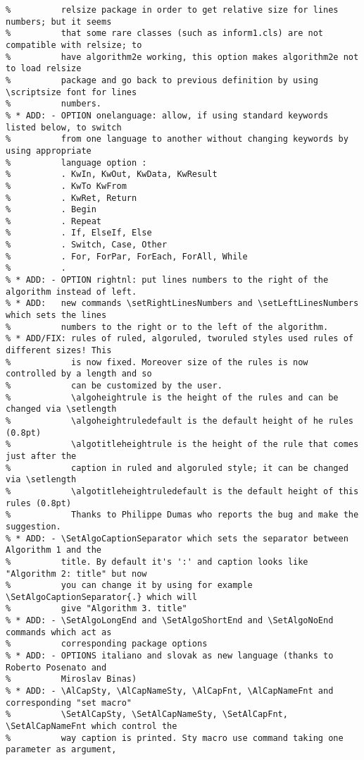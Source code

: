 \documentclass[a4paper]{article}
\begin{document}
\begin{verbatim}
%          relsize package in order to get relative size for lines numbers; but it seems
%          that some rare classes (such as inform1.cls) are not compatible with relsize; to
%          have algorithm2e working, this option makes algorithm2e not to load relsize
%          package and go back to previous definition by using \scriptsize font for lines
%          numbers.
% * ADD: - OPTION onelanguage: allow, if using standard keywords listed below, to switch
%          from one language to another without changing keywords by using appropriate
%          language option :
%          . KwIn, KwOut, KwData, KwResult
%          . KwTo KwFrom
%          . KwRet, Return
%          . Begin
%          . Repeat
%          . If, ElseIf, Else
%          . Switch, Case, Other
%          . For, ForPar, ForEach, ForAll, While
%          .
% * ADD: - OPTION rightnl: put lines numbers to the right of the algorithm instead of left.
% * ADD:   new commands \setRightLinesNumbers and \setLeftLinesNumbers which sets the lines
%          numbers to the right or to the left of the algorithm.
% * ADD/FIX: rules of ruled, algoruled, tworuled styles used rules of different sizes! This
%            is now fixed. Moreover size of the rules is now controlled by a length and so
%            can be customized by the user.
%            \algoheightrule is the height of the rules and can be changed via \setlength
%            \algoheightruledefault is the default height of he rules (0.8pt)
%            \algotitleheightrule is the height of the rule that comes just after the
%            caption in ruled and algoruled style; it can be changed via \setlength
%            \algotitleheightruledefault is the default height of this rules (0.8pt)
%            Thanks to Philippe Dumas who reports the bug and make the suggestion.
% * ADD: - \SetAlgoCaptionSeparator which sets the separator between Algorithm 1 and the
%          title. By default it's ':' and caption looks like "Algorithm 2: title" but now
%          you can change it by using for example \SetAlgoCaptionSeparator{.} which will
%          give "Algorithm 3. title"
% * ADD: - \SetAlgoLongEnd and \SetAlgoShortEnd and \SetAlgoNoEnd commands which act as
%          corresponding package options
% * ADD: - OPTIONS italiano and slovak as new language (thanks to Roberto Posenato and
%          Miroslav Binas) 
% * ADD: - \AlCapSty, \AlCapNameSty, \AlCapFnt, \AlCapNameFnt and corresponding "set macro" 
%          \SetAlCapSty, \SetAlCapNameSty, \SetAlCapFnt, \SetAlCapNameFnt which control the
%          way caption is printed. Sty macro use command taking one parameter as argument, 

\end{verbatim}
\end{document}
